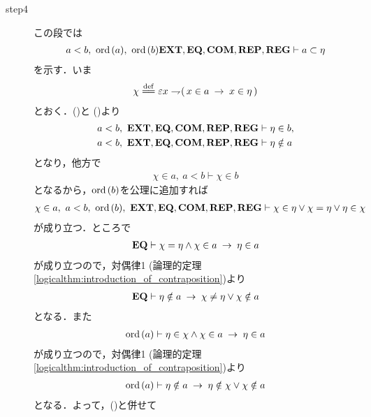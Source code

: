 \begin{prf}
\begin{description}
			\item[step4] この段では
				\begin{align}
					a < b,\ \operatorname*{ord}\hspace{0.15em}(a),\ \operatorname*{ord}\hspace{0.15em}(b) \mbox{{\bf EXT}},\mbox{{\bf EQ}},\mbox{\bf COM},\mbox{{\bf REP}},\mbox{{\bf REG}} \vdash a \subset \eta 
				\end{align}
				を示す．いま
				\begin{align}
					\chi \defeq \varepsilon x \negation (\, x \in a \rarrow x \in \eta\, )
				\end{align}
				とおく．()と
				()より
				\begin{align}
					a < b,\ \mbox{{\bf EXT}},\mbox{{\bf EQ}},\mbox{\bf COM},\mbox{{\bf REP}},\mbox{{\bf REG}} &\vdash \eta \in b, 
					\label{fom:element_and_proper_subset_correspond_11} \\
					a < b,\ \mbox{{\bf EXT}},\mbox{{\bf EQ}},\mbox{\bf COM},\mbox{{\bf REP}},\mbox{{\bf REG}} &\vdash \eta \notin a
					\label{fom:element_and_proper_subset_correspond_12}
				\end{align}
				となり，他方で
				\begin{align}
					\chi \in a,\ a < b \vdash \chi \in b
				\end{align}
				となるから，$\operatorname*{ord}\hspace{0.15em}(b)$を公理に追加すれば
				\begin{align}
					\chi \in a,\ a < b,\ \ord{b},\ \EXTAX,\EQAX,\COMAX,\REPAX,\REGAX 
					\vdash \chi \in \eta \vee \chi = \eta \vee \eta \in \chi
					\label{fom:element_and_proper_subset_correspond_13}
				\end{align}
				が成り立つ．ところで
				\begin{align}
					\mbox{{\bf EQ}} \vdash \chi = \eta \wedge \chi \in a \hspace{0.25em}\rightarrow\hspace{0.25em} \eta \in a
				\end{align}
				が成り立つので，対偶律1 (論理的定理\ref{logicalthm:introduction_of_contraposition})より
				\begin{align}
					\mbox{{\bf EQ}} \vdash \eta \notin a \hspace{0.25em}\rightarrow\hspace{0.25em} \chi \neq \eta \vee \chi \notin a
				\end{align}
				となる．また
				\begin{align}
					\operatorname*{ord}\hspace{0.15em}(a) \vdash \eta \in \chi \wedge \chi \in a \hspace{0.25em}\rightarrow\hspace{0.25em} \eta \in a
				\end{align}
				が成り立つので，対偶律1 (論理的定理\ref{logicalthm:introduction_of_contraposition})より
				\begin{align}
					\operatorname*{ord}\hspace{0.15em}(a) \vdash \eta \notin a \hspace{0.25em}\rightarrow\hspace{0.25em} \eta \notin \chi \vee \chi \notin a
				\end{align}
				となる．よって，()と併せて
				\begin{align}

\end{align}
\end{description}
\end{prf}

